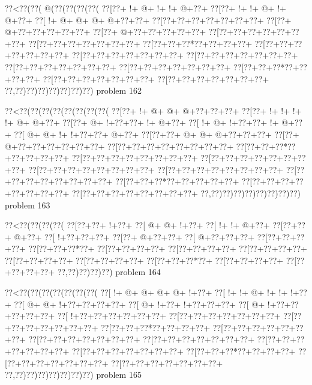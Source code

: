\vbox{\vbox{\goo
\0??<\0??(\0??(\- @(\0??(\0??(\0??(\0??(
\0??[\0??+\- !+\- @+\- !+\- !+\- @+\0??+
\0??[\0??+\- !+\- !+\- @+\- !+\- @+\0??+
\0??[\- !+\- @+\- @+\- @+\- @+\0??+\0??+
\0??[\0??+\0??+\0??+\0??+\0??+\0??+\0??+
\0??[\0??+\- @+\0??+\0??+\0??+\0??+\0??+
\0??[\0??+\- @+\0??+\0??+\0??+\0??+\0??+
\0??[\0??+\0??+\0??+\0??+\0??+\0??+\0??+
\0??[\0??+\0??+\0??+\0??+\0??+\0??+\0??+
\0??[\0??+\0??+\0??*\0??+\0??+\0??+\0??+
\0??[\0??+\0??+\0??+\0??+\0??+\0??+\0??+
\0??[\0??+\0??+\0??+\0??+\0??+\0??+\0??+
\0??[\0??+\0??+\0??+\0??+\0??+\0??+\0??+
\0??[\0??+\0??+\0??+\0??+\0??+\0??+\0??+
\0??[\0??+\0??+\0??+\0??+\0??+\0??+\0??+
\0??[\0??+\0??+\0??*\0??+\0??+\0??+\0??+
\0??[\0??+\0??+\0??+\0??+\0??+\0??+\0??+
\0??[\0??+\0??+\0??+\0??+\0??+\0??+\0??+
\0??,\0??)\0??)\0??)\0??)\0??)\0??)\0??)
}
\hfil problem 162\hfil\break
}

\vbox{\vbox{\goo
\0??<\0??(\0??(\0??(\0??(\0??(\0??(\0??(\0??(
\0??[\0??+\- !+\- @+\- @+\- @+\0??+\0??+\0??+
\0??[\0??+\- !+\- !+\- !+\- !+\- @+\- @+\0??+
\0??[\0??+\- @+\- !+\0??+\0??+\- !+\- @+\0??+
\0??[\- !+\- @+\- !+\0??+\0??+\- !+\- @+\0??+
\0??[\- @+\- @+\- !+\- !+\0??+\0??+\- @+\0??+
\0??[\0??+\0??+\- @+\- @+\- @+\0??+\0??+\0??+
\0??[\0??+\- @+\0??+\0??+\0??+\0??+\0??+\0??+
\0??[\0??+\0??+\0??+\0??+\0??+\0??+\0??+\0??+
\0??[\0??+\0??+\0??*\0??+\0??+\0??+\0??+\0??+
\0??[\0??+\0??+\0??+\0??+\0??+\0??+\0??+\0??+
\0??[\0??+\0??+\0??+\0??+\0??+\0??+\0??+\0??+
\0??[\0??+\0??+\0??+\0??+\0??+\0??+\0??+\0??+
\0??[\0??+\0??+\0??+\0??+\0??+\0??+\0??+\0??+
\0??[\0??+\0??+\0??+\0??+\0??+\0??+\0??+\0??+
\0??[\0??+\0??+\0??*\0??+\0??+\0??+\0??+\0??+
\0??[\0??+\0??+\0??+\0??+\0??+\0??+\0??+\0??+
\0??[\0??+\0??+\0??+\0??+\0??+\0??+\0??+\0??+
\0??,\0??)\0??)\0??)\0??)\0??)\0??)\0??)\0??)
}
\hfil problem 163\hfil\break
}

\vbox{\vbox{\goo
\0??<\0??(\0??(\0??(\0??(
\0??[\0??+\0??+\- !+\0??+
\0??[\- @+\- @+\- !+\0??+
\0??[\- !+\- !+\- @+\0??+
\0??[\0??+\0??+\- @+\0??+
\0??[\- !+\0??+\0??+\0??+
\0??[\0??+\- @+\0??+\0??+
\0??[\- @+\0??+\0??+\0??+
\0??[\0??+\0??+\0??+\0??+
\0??[\0??+\0??+\0??*\0??+
\0??[\0??+\0??+\0??+\0??+
\0??[\0??+\0??+\0??+\0??+
\0??[\0??+\0??+\0??+\0??+
\0??[\0??+\0??+\0??+\0??+
\0??[\0??+\0??+\0??+\0??+
\0??[\0??+\0??+\0??*\0??+
\0??[\0??+\0??+\0??+\0??+
\0??[\0??+\0??+\0??+\0??+
\0??,\0??)\0??)\0??)\0??)
}
\hfil problem 164\hfil\break
}

\vbox{\vbox{\goo
\0??<\0??(\0??(\0??(\0??(\0??(\0??(\0??(
\0??[\- !+\- @+\- @+\- @+\- @+\- !+\0??+
\0??[\- !+\- !+\- @+\- !+\- !+\- !+\0??+
\0??[\- @+\- @+\- !+\0??+\0??+\0??+\0??+
\0??[\- @+\- !+\0??+\- !+\0??+\0??+\0??+
\0??[\- @+\- !+\0??+\0??+\0??+\0??+\0??+
\0??[\- !+\0??+\0??+\0??+\0??+\0??+\0??+
\0??[\0??+\0??+\0??+\0??+\0??+\0??+\0??+
\0??[\0??+\0??+\0??+\0??+\0??+\0??+\0??+
\0??[\0??+\0??+\0??*\0??+\0??+\0??+\0??+
\0??[\0??+\0??+\0??+\0??+\0??+\0??+\0??+
\0??[\0??+\0??+\0??+\0??+\0??+\0??+\0??+
\0??[\0??+\0??+\0??+\0??+\0??+\0??+\0??+
\0??[\0??+\0??+\0??+\0??+\0??+\0??+\0??+
\0??[\0??+\0??+\0??+\0??+\0??+\0??+\0??+
\0??[\0??+\0??+\0??*\0??+\0??+\0??+\0??+
\0??[\0??+\0??+\0??+\0??+\0??+\0??+\0??+
\0??[\0??+\0??+\0??+\0??+\0??+\0??+\0??+
\0??,\0??)\0??)\0??)\0??)\0??)\0??)\0??)
}
\hfil problem 165\hfil\break
}

